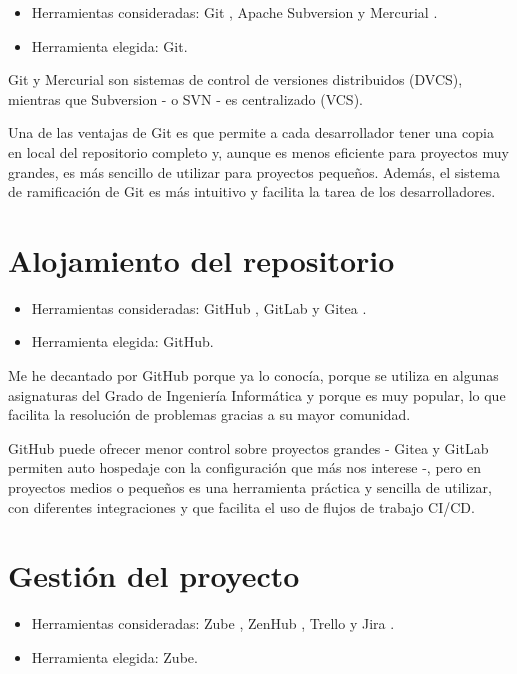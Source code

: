 \begin{itemize}
\tightlist
\item  
Herramientas consideradas: Git \citep{online:git}, Apache Subversion \citep{online:apache_subversion} 
y Mercurial \citep{online:mercurial}.
\item
  Herramienta elegida: Git.
\end{itemize}

Git y Mercurial son sistemas de control de versiones distribuidos (DVCS),
mientras que Subversion - o SVN - es centralizado (VCS). 

Una de las ventajas de Git es que permite a cada desarrollador tener una copia en local del repositorio 
completo y, aunque es menos eficiente para proyectos muy grandes, es más sencillo de utilizar para proyectos 
pequeños. Además, el sistema de ramificación de Git es más intuitivo y facilita la tarea de los desarrolladores. 

\section{Alojamiento del repositorio}\label{alojamiento_repositorio}

\begin{itemize}
\tightlist
\item
  Herramientas consideradas: GitHub \citep{online:github}, GitLab \citep{online:gitlab} y Gitea \citep{online:gitea}.
\item
  Herramienta elegida: GitHub. 
\end{itemize}

Me he decantado por GitHub porque ya lo conocía, porque se utiliza en 
algunas asignaturas del Grado de Ingeniería Informática y porque es muy 
popular, lo que facilita la resolución de problemas gracias a su mayor 
comunidad. 

GitHub puede ofrecer menor control sobre proyectos grandes - Gitea y GitLab 
permiten auto hospedaje con la configuración que más nos interese -, pero en 
proyectos medios o pequeños es una herramienta práctica y sencilla de 
utilizar, con diferentes integraciones y que facilita el uso de flujos 
de trabajo CI/CD. 

\section{Gestión del proyecto}\label{gestion_del_proyecto}

\begin{itemize}
\tightlist
\item
  Herramientas consideradas: Zube \citep{online:zube}, ZenHub \citep{online:zenhub}, Trello \citep{online:trello} y Jira \citep{online:jira}. 
\item
  Herramienta elegida: Zube.
\end{itemize}

